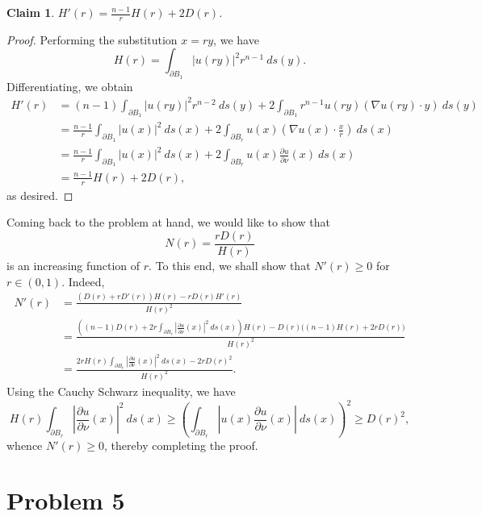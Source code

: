\documentclass[10pt]{amsart}
\theoremstyle{thmstyle}
\newtheorem*{claim}{Claim}
\theoremstyle{defstyle}
\renewcommand{\ge}{\geqslant}
\begin{document}
\begin{claim}
    $\displaystyle H'(r) = \frac{n - 1}{r}H(r) + 2D(r)$.
\end{claim}
\begin{proof}
Performing the substitution $x = ry$, we have 
\begin{equation*}
    H(r) = \int_{\partial B_1}|u(ry)|^2 r^{n - 1}~ds(y).
\end{equation*}
Differentiating, we obtain 
\begin{align*}
    H'(r) &= (n - 1)\int_{\partial B_1}|u(ry)|^2 r^{n - 2}~ds(y) + 2\int_{\partial B_1} r^{n - 1}u(ry)\left(\nabla u(ry)\cdot y\right)~ds(y)\\
    &= \frac{n - 1}{r}\int_{\partial B_1}|u(x)|^2~ds(x) + 2\int_{\partial B_r}u(x)\left(\nabla u(x)\cdot\frac{x}{r}\right)~ds(x)\\
    &= \frac{n - 1}{r}\int_{\partial B_1}|u(x)|^2~ds(x) + 2\int_{\partial B_r}u(x)\frac{\partial u}{\partial\nu}(x)~ds(x)\\
    &= \frac{n - 1}{r} H(r) + 2D(r),
\end{align*}
as desired.
\end{proof}

Coming back to the problem at hand, we would like to show that 
\begin{equation*}
    N(r) = \frac{rD(r)}{H(r)}
\end{equation*}
is an increasing function of $r$. To this end, we shall show that $N'(r)\ge 0$ for $r\in (0, 1)$. Indeed,
\begin{align*}
    N'(r) &= \frac{\left(D(r) + rD'(r)\right)H(r) - rD(r)H'(r)}{H(r)^2}\\
    &= \frac{\left((n - 1)D(r) + 2r\int_{\partial B_r}\left|\frac{\partial u}{\partial\nu}(x)\right|^2~ds(x)\right)H(r) - D(r)\bigg((n - 1)H(r) + 2rD(r)\bigg)}{H(r)^2}\\
    &= \frac{2rH(r)\int_{\partial B_r}\left|\frac{\partial u}{\partial\nu}(x)\right|^2~ds(x) - 2rD(r)^2}{H(r)^2}.
\end{align*}
Using the Cauchy Schwarz inequality, we have 
\begin{equation*}
    H(r)\int_{\partial B_r}\left|\frac{\partial u}{\partial\nu}(x)\right|^2~ds(x)\ge\left(\int_{\partial B_r}\left|u(x)\frac{\partial u}{\partial\nu}(x)\right|~ds(x)\right)^2\ge D(r)^2,
\end{equation*}
whence $N'(r)\ge 0$, thereby completing the proof. 

\section{Problem 5}
\end{document}
